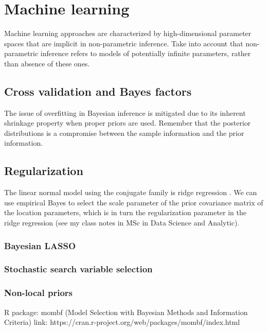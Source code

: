 \chapter{Machine learning}\label{chap13}

Machine learning approaches are characterized by high-dimensional parameter spaces that are implicit in non-parametric inference. Take into account that non-parametric inference refers to models of potentially infinite parameters, rather than absence of these ones.

\section{Cross validation and Bayes factors}\label{sec13_1}
The issue of overfitting in Bayesian inference is mitigated due to its inherent shrinkage property when proper priors are used. Remember that the posterior distributions is a compromise between the sample information and the prior information.

\section{Regularization}\label{sec13_2}
The linear normal model using the conjugate family is ridge regression \cite{Ishwaran2005}. We can use empirical Bayes to select the scale parameter of the prior covariance matrix of the location parameters, which is in turn the regularization parameter in the ridge regression (see my class notes in MSc in Data Science and Analytic).

\subsection{Bayesian LASSO}\label{sec13_21}

\subsection{Stochastic search variable selection}\label{sec13_22}

\subsection{Non-local priors}\label{sec13_23}

\cite{johnson2012bayesian}
R package: mombf (Model Selection with Bayesian Methods and Information Criteria)
link: https://cran.r-project.org/web/packages/mombf/index.html

